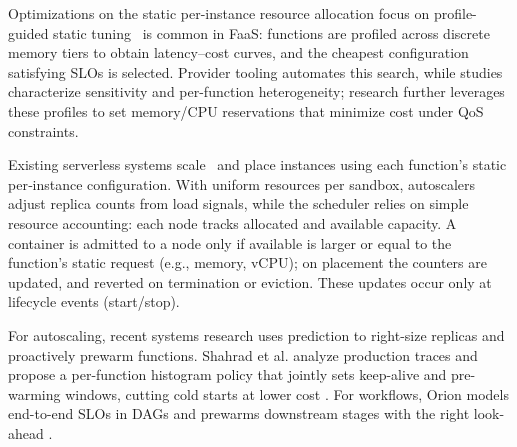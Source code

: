 Optimizations on the static per-instance resource allocation focus on
profile-guided static tuning~\cite{aws_lambda_power_tuning,ASPLOS21:FaasCache, shahrad2020serverless, wang2018peeking, pu2019shuffling}
is common in FaaS: functions are profiled
across discrete memory tiers to obtain latency–cost curves, and the
cheapest configuration satisfying SLOs is selected. Provider tooling
automates this search, while studies characterize sensitivity and
per-function heterogeneity; research further leverages these profiles
to set memory/CPU reservations that minimize cost under QoS
constraints.

Existing serverless systems scale~\cite{aws_scaling_window, aws_scaling_eq,
knative_scaling} and place instances using each function’s
static per‑instance configuration. With uniform resources per sandbox, autoscalers
adjust replica counts from load signals, while the scheduler relies on simple
resource accounting: each node tracks allocated and available capacity.
A container is admitted to a node only if available is larger or equal to the
function’s static request (e.g., memory, vCPU); on placement the counters are updated,
and reverted on termination or eviction. These updates occur only at lifecycle events (start/stop).


For autoscaling, recent systems research uses prediction to
right-size replicas and proactively prewarm functions. Shahrad et al.
analyze production traces and propose a per-function histogram policy
that jointly sets keep-alive and pre-warming windows, cutting cold
starts at lower cost \cite{shahrad2020serverless}. For workflows,
Orion models end-to-end SLOs in DAGs and prewarms downstream stages
with the right look-ahead \cite{ORION_MahgoubYSECB22}.

